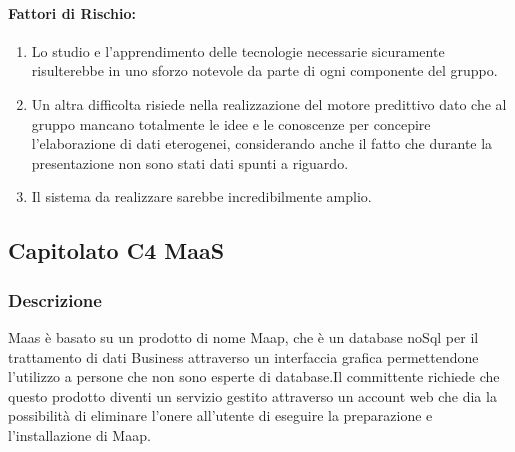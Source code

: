 \documentclass[12pt,a4paper]{article}
\begin{document}
\paragraph{Fattori di Rischio:}
	\begin{enumerate}
\item	Lo studio e l'apprendimento delle tecnologie necessarie sicuramente risulterebbe in uno sforzo notevole da parte di ogni componente del gruppo.

\item	Un altra difficolta risiede nella realizzazione del motore predittivo dato che al gruppo mancano totalmente le idee e le conoscenze per concepire l'elaborazione di dati eterogenei, considerando anche il fatto che durante la presentazione non sono	stati dati spunti a riguardo.
\item	Il sistema da realizzare sarebbe incredibilmente amplio.
\end{enumerate}

\newpage
\subsection{Capitolato C4 MaaS}
\subsubsection{Descrizione}
Maas è basato su un prodotto di nome Maap, che è un database noSql per il trattamento di dati Business attraverso un interfaccia grafica permettendone l'utilizzo a persone che non sono esperte di database.Il committente richiede che questo prodotto diventi un servizio gestito attraverso un account web che dia la possibilità di eliminare l'onere all'utente di eseguire la preparazione e l'installazione di Maap.
\end{document}

